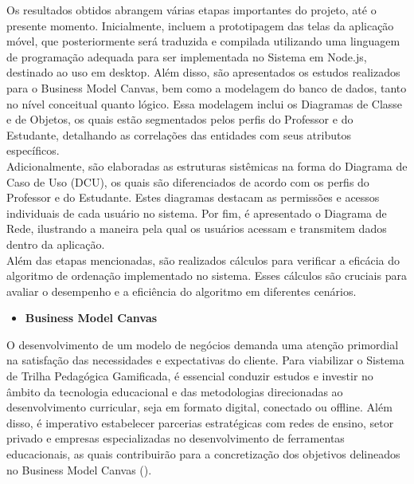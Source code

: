 Os resultados obtidos abrangem várias etapas importantes do projeto, até o presente momento. Inicialmente, incluem a prototipagem das telas da aplicação móvel, que posteriormente será traduzida e compilada utilizando uma linguagem de programação adequada para ser implementada no Sistema em Node.js, destinado ao uso em desktop. Além disso, são apresentados os estudos realizados para o Business Model Canvas, bem como a modelagem do banco de dados, tanto no nível conceitual quanto lógico. Essa modelagem inclui os Diagramas de Classe e de Objetos, os quais estão segmentados pelos perfis do Professor e do Estudante, detalhando as correlações das entidades com seus atributos específicos.
\\

Adicionalmente, são elaboradas as estruturas sistêmicas na forma do Diagrama de Caso de Uso (DCU), os quais são diferenciados de acordo com os perfis do Professor e do Estudante. Estes diagramas destacam as permissões e acessos individuais de cada usuário no sistema. Por fim, é apresentado o Diagrama de Rede, ilustrando a maneira pela qual os usuários acessam e transmitem dados dentro da aplicação.
\\

Além das etapas mencionadas, são realizados cálculos para verificar a eficácia do algoritmo de ordenação implementado no sistema. Esses cálculos são cruciais para avaliar o desempenho e a eficiência do algoritmo em diferentes cenários.
\\

\begin{itemize}

\item \textbf{Business Model Canvas}
\\

\end{itemize}

O desenvolvimento de um modelo de negócios demanda uma atenção primordial na satisfação das necessidades e expectativas do cliente. Para viabilizar o Sistema de Trilha Pedagógica Gamificada, é essencial conduzir estudos e investir no âmbito da tecnologia educacional e das metodologias direcionadas ao desenvolvimento curricular, seja em formato digital, conectado ou offline. Além disso, é imperativo estabelecer parcerias estratégicas com redes de ensino, setor privado e empresas especializadas no desenvolvimento de ferramentas educacionais, as quais contribuirão para a concretização dos objetivos delineados no Business Model Canvas ().
\\

